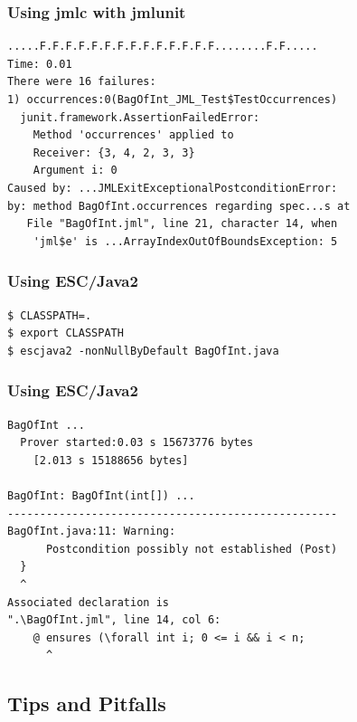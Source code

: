 \begin{frame}[fragile]
\frametitle{Using jmlc with jmlunit}

{\small
\begin{verbatim}
.....F.F.F.F.F.F.F.F.F.F.F.F.F.F........F.F.....
Time: 0.01
There were 16 failures:
1) occurrences:0(BagOfInt_JML_Test$TestOccurrences)
  junit.framework.AssertionFailedError:
    Method 'occurrences' applied to
    Receiver: {3, 4, 2, 3, 3}
    Argument i: 0
Caused by: ...JMLExitExceptionalPostconditionError:
by: method BagOfInt.occurrences regarding spec...s at
   File "BagOfInt.jml", line 21, character 14, when
    'jml$e' is ...ArrayIndexOutOfBoundsException: 5
\end{verbatim}
}
\end{frame}

\begin{frame}[fragile]
\frametitle{Using ESC/Java2}

\begin{example}
\begin{verbatim}
$ CLASSPATH=.
$ export CLASSPATH
$ escjava2 -nonNullByDefault BagOfInt.java
\end{verbatim}
\end{example}
\end{frame}

\begin{frame}[fragile]
\frametitle{Using ESC/Java2}

{\small
\begin{verbatim}
BagOfInt ...
  Prover started:0.03 s 15673776 bytes
    [2.013 s 15188656 bytes]

BagOfInt: BagOfInt(int[]) ...
---------------------------------------------------
BagOfInt.java:11: Warning: 
      Postcondition possibly not established (Post)
  }
  ^
Associated declaration is 
".\BagOfInt.jml", line 14, col 6:
    @ ensures (\forall int i; 0 <= i && i < n;
      ^
\end{verbatim}
}
\end{frame}

\subsection[Tips/Pitfalls]{Tips and Pitfalls}

